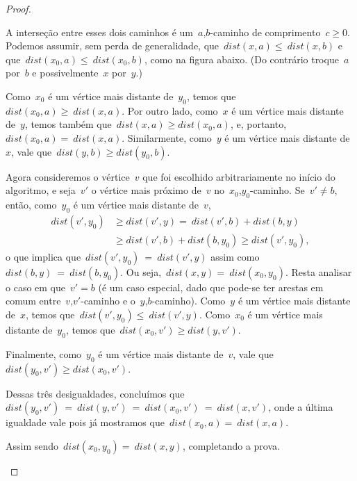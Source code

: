\documentclass[a4paper,12pt]{article}
\begin{document}
\begin{proof}
\begin{itemize}
			A interseção entre esses dois caminhos é 
			um~$a$,$b$-caminho de comprimento~$c \ge 0$.
			Podemos assumir, sem perda de generalidade, 
			que~$dist(x,a) \le~dist(x,b)$ e 
			que~$dist(x_0,a) \le~dist(x_0,b)$, como na figura 
			abaixo.
			(Do contrário troque~$a$ por~$b$ e possivelmente~$x$
			por~$y$.)

			\begin{center}  \end{center}


			Como~$x_0$ é um vértice mais distante de~$y_0$,
			temos que~$dist(x_0,a)\ge~dist(x,a)$.
			Por outro lado, como~$x$ é um vértice mais distante
			de~$y$, temos também que~$dist(x,a)\ge dist(x_0,a)$,
			e, portanto,~$dist(x_0,a) =~dist(x,a)$.
			Similarmente, como~$y$ é um vértice mais distante 
			de~$x$, vale que~$dist(y,b) \ge dist(y_0,b)$.

			Agora consideremos o vértice~$v$ que foi escolhido 
			arbitrariamente no início do algoritmo, e seja~$v'$
			o vértice mais próximo de~$v$ no~$x_0$,$y_0$-caminho.
			Se~$v'\ne b$, então, como~$y_0$ é um vértice mais 
			distante de~$v$,
			\begin{align}
				dist(v',y_0) &\ge dist(v',y) =~dist(v',b) + 
				dist(b,y)\nonumber \\
				&\ge dist(v',b) + dist(b,y_0) \ge dist(v',y_0) 
				\nonumber,
			\end{align} 
			o que implica que~$dist(v',y_0)~=~dist(v',y)$ assim
			como~$ dist(b,y)~=~dist(b,y_0)$. 
			Ou seja,~$dist(x,y) =~dist(x_0,y_0)$.
			Resta analisar o caso em que~$v'=b$ (é um caso 
			especial, dado que pode-se ter arestas em comum 
			entre~$v$,$v'$-caminho e o~$y$,$b$-caminho).
			Como~$y$ é um vértice mais distante de~$x$, temos 
			que~$dist(v',y_0) \le~dist(v',y)$.
			Como~$x_0$ é um vértice mais distante de~$y_0$, temos
			que~$dist(x_0,v') \ge dist(y,v')$.
			
			Finalmente, como~$y_0$ é um vértice mais distante 
			de~$v$, vale que~$dist(y_0,v')\ge dist(x_0,v')$.

			Dessas três desigualdades, concluímos 
			que~$dist(y_0,v')~=~dist(y,v')~=
			~dist(x_0,v')~=~dist(x,v')$,
			onde a última igualdade vale pois já mostramos 
			que~$dist(x_0,a) =~dist(x,a)$.

			Assim sendo~$dist(x_0,y_0) =~dist(x,y)$, completando a 
			prova.

		\end{itemize}
	\end{proof}
\end{document}
